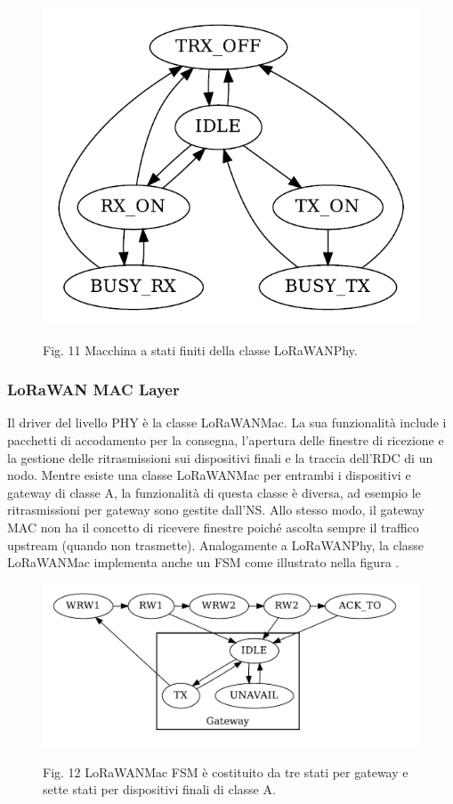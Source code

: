\documentclass[a4paper]{report} %
\begin{document}
\begin{figure}
\centering
\includegraphics[scale=.5]{Immagini/MSFLoRaWAN.png}

Fig. 11 Macchina a stati finiti della classe LoRaWANPhy.
\end{figure}

\subsubsection{LoRaWAN MAC Layer} 
Il driver del livello PHY è la classe LoRaWANMac. La sua funzionalità include i pacchetti di accodamento per la consegna, l'apertura delle finestre di ricezione e la gestione delle ritrasmissioni sui dispositivi finali e la traccia dell'RDC di un nodo. Mentre esiste una classe LoRaWANMac per entrambi i dispositivi e gateway di classe A, la funzionalità di questa classe è diversa, ad esempio le ritrasmissioni per gateway sono gestite dall'NS. Allo stesso modo, il gateway MAC non ha il concetto di ricevere finestre poiché ascolta sempre il traffico upstream (quando non trasmette). Analogamente a LoRaWANPhy, la classe LoRaWANMac implementa anche un FSM come illustrato nella figura \cite{art:rif.49}. 

\begin{figure}
\centering
\includegraphics[scale=.5]{Immagini/MSFLoRaMAC.png}

Fig. 12 LoRaWANMac FSM è costituito da tre stati per gateway e sette stati per dispositivi finali di classe A.
\end{figure}
\end{document}
